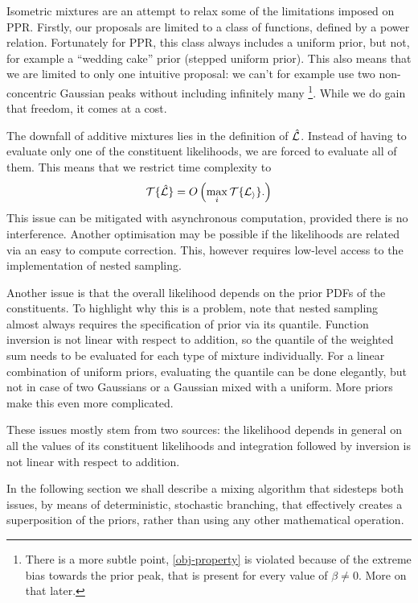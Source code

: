 \documentclass[usenatbib]{mnras}
\begin{document}
Isometric mixtures are an attempt to relax some of the limitations
imposed on PPR. Firstly, our proposals are limited to a class of
functions, defined by a power relation. Fortunately for PPR, this
class always includes a uniform prior, but not, for example a
``wedding cake'' prior (stepped uniform prior). This also means that
we are limited to only one intuitive proposal: we can't for example use
two non-concentric Gaussian peaks without including infinitely many \footnote{There is a more subtle point,
  \cref{obj-property} is violated because of the extreme bias towards
  the prior peak, that is present for every value of $\beta\ne0$. More
  on that later.}. While we do gain that freedom, it comes at a cost.

The downfall of additive mixtures lies in the definition of
$\hat{\cal L}$. Instead of having to evaluate only one of the
constituent likelihoods, we are forced to evaluate all of them. This
means that we restrict time complexity to
\begin{equation}
  {\cal T}\{\hat{\cal L}\} = O \left(   \max_{i} {\cal T}\{ {\cal L_{i}}\}. \right)\label{eq:hard-cap}
\end{equation}
This issue can be mitigated with asynchronous computation, provided
there is no interference. Another optimisation may be possible if the
likelihoods are related via an easy to compute correction.  This,
however requires low-level access to the implementation of nested
sampling.

Another issue is that the overall likelihood depends on the prior PDFs
of the constituents. To highlight why this is a problem, note that
nested sampling almost always requires the specification of prior via
its quantile. Function inversion is not linear with respect to
addition, so the quantile of the weighted sum needs to be evaluated
for each type of mixture individually. For a linear combination of
uniform priors, evaluating the quantile can be done elegantly, but not
in case of two Gaussians or a Gaussian mixed with a uniform. More
priors make this even more complicated.

These issues mostly stem from two sources: the likelihood depends in
general on all the values of its constituent likelihoods and
integration followed by inversion is not linear with respect to
addition.

In the following section we shall describe a mixing algorithm that
sidesteps both issues, by means of deterministic, stochastic
branching, that effectively creates a superposition of the priors,
rather than using any other mathematical operation.
\end{document}
